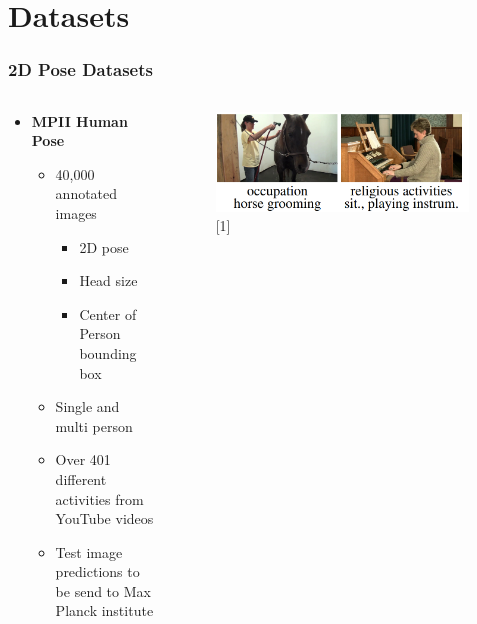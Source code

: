 \documentclass[9pt]{beamer}
\providecommand{\sourcefix}[1]{\\ \footnotesize \tugreen{Source:} [#1]}
\newenvironment{myframe}[1][]{%
\begin{frame}%
\frametitle{#1}
\setcounter{footnote}{0}


}{%
\end{frame}%
}
\begin{document}
\section{Datasets}
\begin{myframe}[2D Pose Datasets]
  \begin{columns}[T]
      \begin{column}{.48\textwidth}
          \begin{itemize}
              \item \textbf{MPII Human Pose\footnotemark}
              \begin{itemize}
                  \item 40,000 annotated images
                  \begin{itemize}
                      \item 2D pose
                      \item Head size
                      \item Center of Person bounding box
                  \end{itemize}
                  \item Single and multi person
                  \item Over 401 different activities from YouTube videos
                  \item Test image predictions to be send to Max Planck institute
              \end{itemize}
          \end{itemize}
      \end{column}
      \begin{column}{.48\textwidth}
          \begin{figure}
              \includegraphics[width=0.99\textwidth]{mpii.png}
              \sourcefix{1}
          \end{figure}
      \end{column}
  \end{columns}
\end{myframe}
\end{document}
